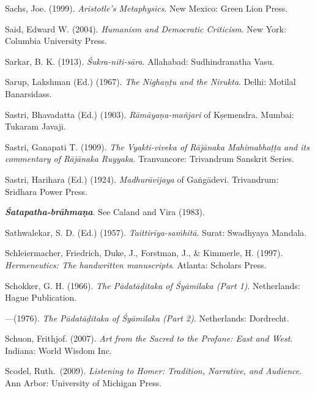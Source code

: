 \begin{thebibliography}{99}
Sachs, Joe. (1999). {\sl Aristotle’s Metaphysics}. New Mexico: Green Lion Press. 

Said, Edward W. (2004).  {\sl Humanism and Democratic Criticism}. New York: Columbia University Press. 

Sarkar, B. K. (1913). {\sl Śukra-nīti-sāra}. Allahabad: Sudhindranatha Vasu. 

Sarup, Lakshman (Ed.) (1967). {\sl The Nighaṇṭu and the Nirukta}. Delhi: Motilal Banarsidass.

Sastri, Bhavadatta (Ed.) (1903). {\sl Rāmāyaṇa-mañjari} of Kṣemendra. Mumbai: Tukaram Javaji. 

Sastri, Ganapati T. (1909). {\sl The Vyakti-viveka of Rājānaka Mahimabhaṭṭa and its commentary of Rājānaka Ruyyaka}. Tranvancore: Trivandrum Sanskrit Series. 

Sastri, Harihara (Ed.) (1924). {\sl Madhurāvijaya} of Gaṅgādevi. Trivandrum: Sridhara Power Press. 


{\sl\bfseries Śatapatha-brāhmaṇa}. See Caland and Vira (1983).

Sathwalekar, S. D. (Ed.) (1957). {\sl Taittirīya-saṁhitā}. Surat: Swadhyaya Mandala.

Schleiermacher, Friedrich, Duke, J., Forstman, J., \& Kimmerle, H. (1997). {\sl Hermeneutics: The handwritten manuscripts}. Atlanta: Scholars Press.  

Schokker, G. H. (1966). {\sl The Pādatāḍitaka of Śyāmilaka (Part 1)}. Netherlands: Hague Publication. 

---\kern3pt(1976). {\sl The Pādatāḍitaka of Śyāmilaka (Part 2)}. Netherlands: Dordrecht. 

Schuon, Frithjof. (2007). {\sl Art from the Sacred to the Profane: East and West}. Indiana: World Wisdom Inc. 

Scodel, Ruth.\ (2009). {\sl Listening to Homer: Tradition, Narrative, and Audience}. Ann Arbor: University of Michigan Press. 


\end{thebibliography}
